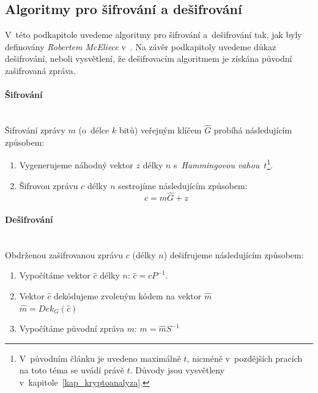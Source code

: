 \documentclass[thesis=M,czech,hidelinks]{FITthesis}[2012/06/26]
\newcommand{\0}{{\textcolor[gray]{0.75}{0}}}
\begin{document}
\subsection{Algoritmy pro šifrování a dešifrování}\label{kap_mceliece_algoritmy}

V~této podkapitole uvedeme algoritmy pro šifrování a~dešifrování tak, jak
byly definovány \emph{Robertem McEliece} v~\cite{McEliece}. Na závěr podkapitoly
uvedeme důkaz dešifrování, neboli vysvětlení, že dešifrovacím algoritmem je
získána původní zašifrovaná zpráva.

\paragraph{Šifrování} \hfil \\
Šifrování zprávy $m$ (o~délce $k$ bitů) veřejným klíčem $\hat{G}$ probíhá
následujícím způsobem:

\begin{enumerate}
    \item Vygenerujeme náhodný vektor $z$ délky $n$ s~\emph{Hammingovou
        vahou}~$t$\footnote{
            V~původním článku je uvedeno maximálně $t$, nicméně v~pozdějších
            pracích na toto téma se uvádí právě $t$. Důvody jsou vysvětleny
            v~kapitole~\ref{kap_kryptoanalyza}.
        }.
    \item Šifrovou zprávu $c$ délky $n$ sestrojíme následujícím způsobem:
        $$ c = m \hat{G} + z $$
\end{enumerate}

\paragraph{Dešifrování} \hfil \\
Obdrženou zašifrovanou zprávu $c$ (délky $n$) dešifrujeme následujícím způsobem:

\begin{enumerate}
    \item Vypočítáme vektor $\hat{c}$ délky $n$: $\hat{c} = c P^{-1}$.
    \item Vektor $\hat{c}$ dekódujeme zvoleným kódem na vektor $\hat{m}$ \\
        $\hat{m} = Dek_{G}\left(\hat{c}\right)$
    \item Vypočítáme původní zpráva $m$: $m = \hat{m} S^{-1}$
\end{enumerate}
\end{document}
